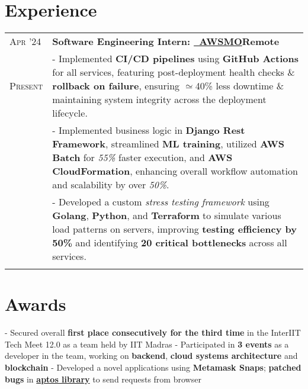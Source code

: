 \documentclass[a4paper,10pt]{extarticle} %
\begin{document}
\section{\textcolor{primary}{Experience}}
\vspace{+0.1cm}

\begin{tabularx}{\linewidth}{ l | X }

\textsc{Apr '24} & \textbf{Software Engineering Intern: {\href{https://awsmo.ai/}{\ AWSMO}}}\hfill\textbf{Remote} \\
\textsc{Present} & {- Implemented \textbf{CI/CD pipelines} using \textbf{GitHub Actions} for all services, 
                 featuring post-deployment health checks \& \textbf{rollback on failure}, ensuring $\simeq$40\% less downtime \& maintaining system integrity across the deployment lifecycle. } \\
                 & {- Implemented business logic in \textbf{Django Rest Framework}, streamlined \textbf{ML training}, utilized \textbf{AWS Batch} for \textit{55\%} faster execution, and \textbf{AWS CloudFormation}, enhancing overall workflow automation and scalability} by over \textit{50\%}. \\
                 & {- Developed a custom \textit{stress testing framework} using \textbf{Golang}, \textbf{Python}, and \textbf{Terraform} to simulate various load patterns on servers, improving \textbf{testing efficiency by 50\%} and identifying \textbf{20 critical bottlenecks} across all services.} \\

\multicolumn{2}{c}{} \\
\end{tabularx}

 \vspace{-0.1cm}
\section{\textcolor{primary}{Awards}}
 \vspace{0.1cm}
\begin{description}[style=nextline, font=$\bullet$\hspace{2mm}\normalsize]

 \item[{\href{https://interiit-tech.org/}{InterIIT Tech Meet 12.0}} | Contingent Gold ] 
- Secured overall \textbf{first place consecutively for the third time} in the InterIIT Tech Meet 12.0 as a team held by IIT Madras \newline
- Participated in \textbf{3 events} as a developer in the team, working on \textbf{backend}, \textbf{cloud systems architecture} and \textbf{blockchain} \newline
- Developed a novel applications using \textbf{Metamask Snaps}; \textbf{patched bugs} in \href{https://github.com/aptos-labs/aptos-core}{\textbf{aptos library}} to send requests from browser 
\end{description}
\end{document}
